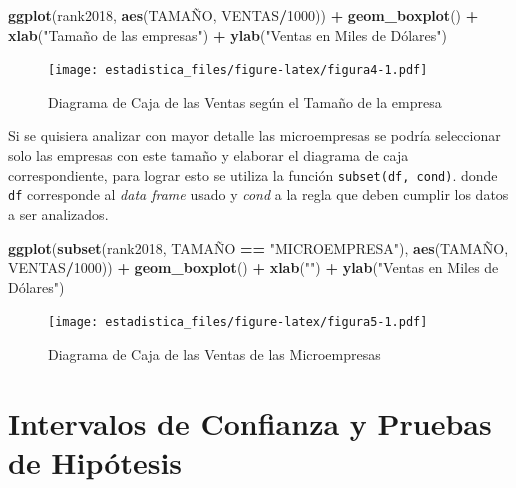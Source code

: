 \documentclass[]{book}
\newenvironment{Shaded}{\begin{snugshade}}{\end{snugshade}}
\newcommand{\KeywordTok}[1]{\textcolor[rgb]{0.13,0.29,0.53}{\textbf{#1}}}
\newcommand{\DecValTok}[1]{\textcolor[rgb]{0.00,0.00,0.81}{#1}}
\newcommand{\StringTok}[1]{\textcolor[rgb]{0.31,0.60,0.02}{#1}}
\newcommand{\OperatorTok}[1]{\textcolor[rgb]{0.81,0.36,0.00}{\textbf{#1}}}
\newcommand{\NormalTok}[1]{#1}
\begin{document}
\begin{Shaded}
\begin{Highlighting}[]
\KeywordTok{ggplot}\NormalTok{(rank2018, }\KeywordTok{aes}\NormalTok{(TAMAÑO, VENTAS}\OperatorTok{/}\DecValTok{1000}\NormalTok{)) }\OperatorTok{+}\StringTok{ }
\StringTok{  }\KeywordTok{geom_boxplot}\NormalTok{() }\OperatorTok{+}\StringTok{ }\KeywordTok{xlab}\NormalTok{(}\StringTok{"Tamaño de las empresas"}\NormalTok{) }\OperatorTok{+}
\StringTok{  }\KeywordTok{ylab}\NormalTok{(}\StringTok{"Ventas en Miles de Dólares")}
\end{Highlighting}
\end{Shaded}

\begin{figure}
\centering
\texttt{[image: estadistica\_files/figure-latex/figura4-1.pdf]}
\caption{\label{fig:figura4}Diagrama de Caja de las Ventas según el Tamaño
de la empresa}
\end{figure}

Si se quisiera analizar con mayor detalle las microempresas se podría
seleccionar solo las empresas con este tamaño y elaborar el diagrama de
caja correspondiente, para lograr esto se utiliza la función
\texttt{subset(df,\ cond)}. donde \texttt{df} corresponde al \emph{data
frame} usado y \emph{cond} a la regla que deben cumplir los datos a ser
analizados.

\begin{Shaded}
\begin{Highlighting}[]
\KeywordTok{ggplot}\NormalTok{(}\KeywordTok{subset}\NormalTok{(rank2018, TAMAÑO }\OperatorTok{==}\StringTok{ "MICROEMPRESA"}\NormalTok{), }\KeywordTok{aes}\NormalTok{(TAMAÑO, VENTAS}\OperatorTok{/}\DecValTok{1000}\NormalTok{)) }\OperatorTok{+}\StringTok{ }
\StringTok{  }\KeywordTok{geom_boxplot}\NormalTok{() }\OperatorTok{+}\StringTok{ }\KeywordTok{xlab}\NormalTok{(}\StringTok{""}\NormalTok{) }\OperatorTok{+}
\StringTok{  }\KeywordTok{ylab}\NormalTok{(}\StringTok{"Ventas en Miles de Dólares")}
\end{Highlighting}
\end{Shaded}

\begin{figure}
\centering
\texttt{[image: estadistica\_files/figure-latex/figura5-1.pdf]}
\caption{\label{fig:figura5}Diagrama de Caja de las Ventas de las
Microempresas}
\end{figure}

\chapter{Intervalos de Confianza y Pruebas de
Hipótesis}\label{intervalos-de-confianza-y-pruebas-de-hipotesis}
\end{document}
